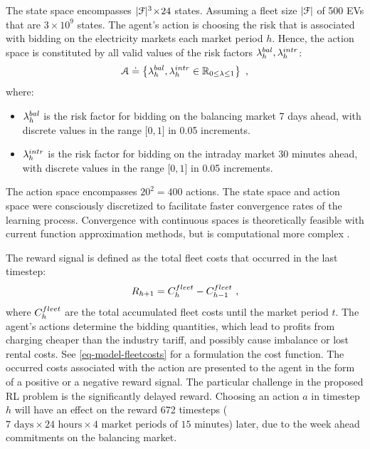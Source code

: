 \documentclass[a4paper, 12pt]{article}
\let\cite\shortcite
\begin{document}
The state space encompasses \(|{\cal{F}}|^3\!\times\!24\) states. Assuming a fleet size
\(|{\cal{F}}|\) of 500 EVs that are \(3\!\times\!10^9\) states.
The agent's action is choosing the risk that is associated with bidding on the
electricity markets each market period \(h\). Hence, the action space is
constituted by all valid values of the risk factors \(\lambda^{bal}_{h},\lambda^{intr}_{h}\):
\begin{equation}
    {\cal A} \doteq \left\{\lambda^{bal}_{h},\lambda^{intr}_{h} \in \mathbb{R}_{0 \leq \lambda \leq 1} \right\} \text{ ,}
\end{equation}
where:
\begin{itemize}
\item \(\lambda^{bal}_{h}\) is the risk factor for bidding on the balancing market 7 days ahead,
with discrete values in the range \(\big[0,1\big]\) in 0.05 increments.
\item \(\lambda^{intr}_{h}\) is the risk factor for bidding on the intraday market 30 minutes
ahead, with discrete values in the range \(\big[0,1\big]\) in 0.05 increments.
\end{itemize}
The action space encompasses \(20^2 = 400\) actions. The state space and action
space were consciously discretized to facilitate faster convergence rates of the
learning process. Convergence with continuous spaces is theoretically feasible
with current function approximation methods, but is computational more complex
\cite{sutton18_reinf}.

The reward signal is defined as the total fleet costs that occurred in the last
timestep:
\begin{equation}
    R_{h+1} = C^{fleet}_{h} - C^{fleet}_{h-1} \text{ ,}
\end{equation}
where \(C^{fleet}_{h}\) are the total accumulated fleet costs until the market period
\(t\). The agent's actions determine the bidding quantities, which lead to profits
from charging cheaper than the industry tariff, and possibly cause imbalance or
lost rental costs. See \eqref{eq-model-fleetcosts} for a formulation the cost
function. The occurred costs associated with the action are presented to the
agent in the form of a positive or a negative reward signal. The particular
challenge in the proposed RL problem is the significantly delayed reward.
Choosing an action \(a\) in timestep \(h\) will have an effect on the reward 672
timesteps (\(7 \text{ days}\!\times\!24\text{ hours}\!\times\!4\text{ market
periods of 15 minutes}\)) later, due to the week ahead commitments on the
balancing market.
\end{document}
